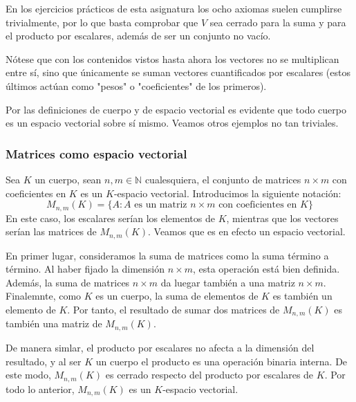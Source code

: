\documentclass[12pt]{article}
\begin{document}
En los ejercicios prácticos de esta asignatura los ocho axiomas suelen cumplirse trivialmente, por lo que
basta comprobar que $V$ sea cerrado para la suma y para el producto por escalares, además de ser un
conjunto no vacío.

\vspace{2mm}
Nótese que con los contenidos vistos hasta ahora los vectores no se multiplican entre sí, sino que únicamente
se suman vectores cuantificados por escalares (estos últimos actúan como "pesos" o "coeficientes"
de los primeros).

\vspace{2mm}
Por las definiciones de cuerpo y de espacio vectorial es evidente que 
todo cuerpo es un espacio vectorial sobre sí mismo. Veamos otros ejemplos no tan triviales.

\vspace{2mm}

\vspace{4mm}
\subsubsection{Matrices como espacio vectorial}
\hspace{3mm}
Sea $K$ un cuerpo, sean $n, m \in \mathbb{N}$ cualesquiera, el conjunto de matrices $n \times m$ con coeficientes
en $K$ es un $K$-espacio vectorial. Introducimos la siguiente notación: \vspace{-2mm}
$$M_{n,m}(K) = \{A : A\text{ es un matriz } n\times m \text{ con coeficientes en }K\}$$
En este caso, los escalares serían los elementos de $K$, mientras que los vectores serían las matrices
de $M_{n,m}(K)$. Veamos que es en efecto un espacio vectorial.

\vspace{2mm}
En primer lugar, consideramos la suma de matrices como la suma término a término. Al haber fijado
la dimensión $n \times m$, esta operación está bien definida. Además, la suma de matrices $n\times m$
da luegar también a una matriz $n \times m$. Finalemnte, como $K$ es un cuerpo, la suma de elementos de $K$
es también un elemento de $K$. Por tanto, el resultado de sumar dos matrices de $M_{n,m}(K)$ es también una matriz
de $M_{n,m}(K)$.

\vspace{2mm}
De manera simlar, el producto por escalares no afecta a la dimensión del resultado, y al ser
$K$ un cuerpo el producto es una operación binaria interna. De este modo, $M_{n,m}(K)$ es cerrado
respecto del producto por escalares de $K$. Por todo lo anterior, $M_{n,m}(K)$ es un $K$-espacio vectorial.
\end{document}
